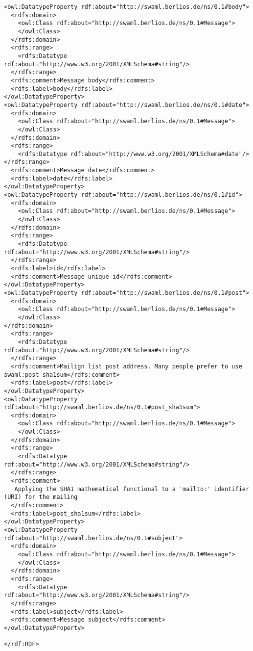\begin{verbatim}
<owl:DatatypeProperty rdf:about="http://swaml.berlios.de/ns/0.1#body">
  <rdfs:domain>
    <owl:Class rdf:about="http://swaml.berlios.de/ns/0.1#Message">
    </owl:Class>
  </rdfs:domain>
  <rdfs:range>
    <rdfs:Datatype rdf:about="http://www.w3.org/2001/XMLSchema#string"/>
  </rdfs:range>
  <rdfs:comment>Message body</rdfs:comment>
  <rdfs:label>body</rdfs:label>
</owl:DatatypeProperty>
<owl:DatatypeProperty rdf:about="http://swaml.berlios.de/ns/0.1#date">
  <rdfs:domain>
    <owl:Class rdf:about="http://swaml.berlios.de/ns/0.1#Message">
    </owl:Class>
  </rdfs:domain>
  <rdfs:range>
    <rdfs:Datatype rdf:about="http://www.w3.org/2001/XMLSchema#date"/>
</rdfs:range>
  <rdfs:comment>Message date</rdfs:comment>
  <rdfs:label>date</rdfs:label>
</owl:DatatypeProperty>
<owl:DatatypeProperty rdf:about="http://swaml.berlios.de/ns/0.1#id">
  <rdfs:domain>
    <owl:Class rdf:about="http://swaml.berlios.de/ns/0.1#Message">
    </owl:Class>
  </rdfs:domain>
  <rdfs:range>
    <rdfs:Datatype rdf:about="http://www.w3.org/2001/XMLSchema#string"/>
  </rdfs:range>
  <rdfs:label>id</rdfs:label>
  <rdfs:comment>Message unique id</rdfs:comment>
</owl:DatatypeProperty>
<owl:DatatypeProperty rdf:about="http://swaml.berlios.de/ns/0.1#post">
  <rdfs:domain>
    <owl:Class rdf:about="http://swaml.berlios.de/ns/0.1#Message">
    </owl:Class>
</rdfs:domain>
  <rdfs:range>
    <rdfs:Datatype rdf:about="http://www.w3.org/2001/XMLSchema#string"/>
  </rdfs:range>
  <rdfs:comment>Mailign list post address. Many people prefer to use swaml:post_sha1sum</rdfs:comment>
  <rdfs:label>post</rdfs:label>
</owl:DatatypeProperty>
<owl:DatatypeProperty rdf:about="http://swaml.berlios.de/ns/0.1#post_sha1sum">
  <rdfs:domain>
    <owl:Class rdf:about="http://swaml.berlios.de/ns/0.1#Message">
    </owl:Class>
  </rdfs:domain>
  <rdfs:range>
    <rdfs:Datatype rdf:about="http://www.w3.org/2001/XMLSchema#string"/>
  </rdfs:range>
  <rdfs:comment>
   Applying the SHA1 mathematical functional to a 'mailto:' identifier (URI) for the mailing
  </rdfs:comment>
  <rdfs:label>post_sha1sum</rdfs:label>
</owl:DatatypeProperty>
<owl:DatatypeProperty rdf:about="http://swaml.berlios.de/ns/0.1#subject">
  <rdfs:domain>
    <owl:Class rdf:about="http://swaml.berlios.de/ns/0.1#Message">
    </owl:Class>
  </rdfs:domain>
  <rdfs:range>
    <rdfs:Datatype rdf:about="http://www.w3.org/2001/XMLSchema#string"/>
  </rdfs:range>
  <rdfs:label>subject</rdfs:label>
  <rdfs:comment>Message subject</rdfs:comment>
</owl:DatatypeProperty>

</rdf:RDF>
\end{verbatim}

